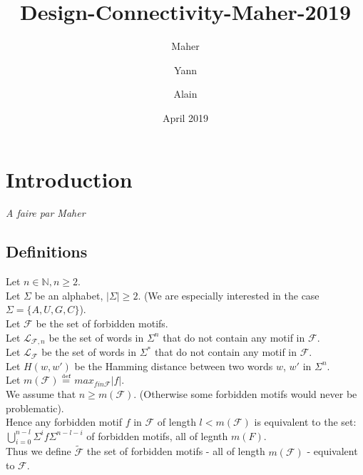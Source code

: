\documentclass{article}
\title{Design-Connectivity-Maher-2019}
\author{Maher \and Yann \and Alain}
\date{April 2019}
\begin{document}
\maketitle

\newtheorem{theorem}{Theorem}
\newtheorem{corollary}[theorem]{Corollary}
\newtheorem{definition}[theorem]{Definition}
\newtheorem{remark}[theorem]{Remark}
\newtheorem{result}[theorem]{Result}



\newcommand{\Nat}{\mathbb{N}}
\newcommand{\PosInt}{\mathbb{N}^*}
\newcommand{\Forb}{\mathcal{F}}
\newcommand{\ForbEqv}{\widetilde{\Forb}}
\newcommand{\Lang}[1]{\mathcal{L}_{#1}}
\newcommand{\LFn}{\Lang{\Forb, n}}
\newcommand{\Hamming}[2]{H(#1,#2)}
\newcommand{\EqDef}{\mathrel{\stackrel{\makebox[0pt]{\mbox{\normalfont\tiny def}}}{=}}}

\section{Introduction}
{\it A faire par Maher}

\subsection*{Definitions}

Let $n \in \Nat, n \geq 2$. \\
Let $\Sigma$ be an alphabet, $|\Sigma| \geq 2$. (We are especially interested in the case $\Sigma = \{A, U, G, C\}$). \\
Let $\Forb$ be the set of forbidden motifs. \\
Let $\LFn$ be the set of words in $\Sigma^n$ that do not contain any motif in $\Forb$. \\
Let $\Lang{\Forb}$ be the set of words in $\Sigma^*$ that do not contain any motif in $\Forb$. \\
Let $H(w,w')$ be the Hamming distance between two words $w$, $w'$ in $\Sigma^n$. \\

\noindent
Let $m(\Forb)$ $\EqDef$ $max_{f in \Forb} |f|$. \\
We assume that $n \geq m(\Forb)$. (Otherwise some forbidden motifs would never be problematic).\\
Hence any forbidden motif $f$ in $\Forb$ of length $l < m(\Forb)$ is equivalent to the set: $\bigcup_{i=0}^{n-l} \Sigma^i f \Sigma^{n-l-i}$ of forbidden motifs, all of legnth $m(F)$. \\
Thus we define $\ForbEqv$ the set of forbidden motifs - all of length $m(\Forb)$ - equivalent to $\Forb$. \\
\end{document}
